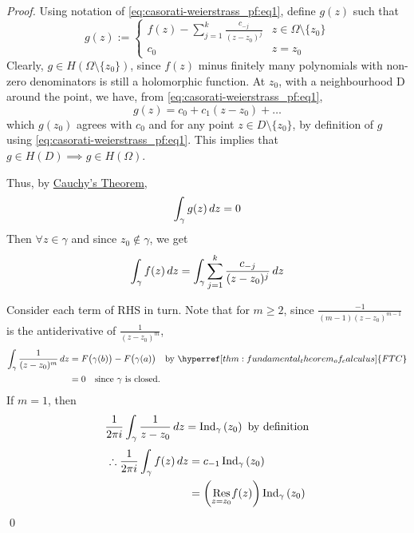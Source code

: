 \documentclass[11pt, oneside]{book}
\begin{document}
\begin{proof}
  Using notation of \cref{eq:casorati-weierstrass_pf:eq1}, define $g(z)$ such that
  \begin{equation*}
    g(z) := \begin{cases}
      f(z) - \sum_{j = 1}^{k} \frac{c_{-j}}{(z - z_0)^j}  & z \in \Omega \setminus \{z_0\} \\
      c_0                                                 & z = z_0
    \end{cases}
  \end{equation*}
  Clearly, $g \in H(\Omega \setminus \{z_0\})$, since $f(z)$ minus finitely many polynomials with non-zero denominators is still a holomorphic function. At $z_0$, with a neighbourhood D around the point, we have, from \cref{eq:casorati-weierstrass_pf:eq1},
  \begin{equation*}
    g(z) = c_0 + c_1 (z - z_0) + \hdots
  \end{equation*}
  which $g(z_0)$ agrees with $c_0$ and for any point $z \in D \setminus \{z_0\}$, by definition of $g$ using \cref{eq:casorati-weierstrass_pf:eq1}. This implies that $g \in H(D) \implies g \in H(\Omega)$.

  Thus, by \hyperref[thm:cauchy_s_theorem_for_convex_set]{Cauchy's Theorem},
  \begin{equation*}
    \int_{\gamma} g(z) \dif{z} = 0
  \end{equation*}
  Then $\forall z \in \gamma$ and since $z_0 \not\in \gamma$, we get
  \begin{equation*}
    \int_{\gamma} f(z) \dif{z} = \int_{\gamma} \sum_{j = 1}^k \frac{c_{-j}}{(z - z_0)^j} \dif{z}
  \end{equation*}

  Consider each term of RHS in turn. Note that for $m \geq 2$, since $\frac{-1}{(m - 1)(z - z_0)^{m - 1}}$ is the antiderivative of $\frac{1}{(z - z_0)^m}$,
  \begin{align*}
    \int_{\gamma} \frac{1}{(z - z_0)^m} \dif{z}
      &= F\big( \gamma(b) \big) - F\big( \gamma(a) \big) \quad \text{by } \hyperref[thm:fundamental_theorem_of_calculus]{FTC} \\
      &= 0 \quad \text{since } \gamma \text{ is closed.}
  \end{align*}
  If $m = 1$, then
  \begin{equation*}
    \frac{1}{2 \pi i} \int_{\gamma} \frac{1}{z - z_0} \dif{z} = \ind{z_0}{\gamma} \text{ by definition}
  \end{equation*}
  \begin{align*}
    \therefore \frac{1}{2 \pi i} \int_{\gamma} f(z) \dif{z}
      &= c_{-1} \ind{z_0}{\gamma} \\
      &= \left( \res{f(z)}{z = z_0} \right) \ind{z_0}{\gamma}
  \end{align*}\qed
\end{proof}
\end{document}
